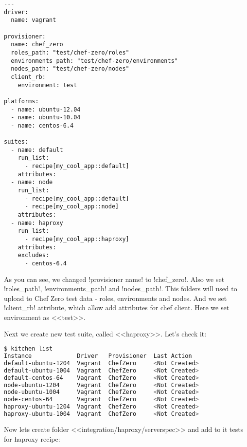 \begin{lstlisting}[label=lst:testing-chef-zero17]
---
driver:
  name: vagrant

provisioner:
  name: chef_zero
  roles_path: "test/chef-zero/roles"
  environments_path: "test/chef-zero/environments"
  nodes_path: "test/chef-zero/nodes"
  client_rb:
    environment: test

platforms:
  - name: ubuntu-12.04
  - name: ubuntu-10.04
  - name: centos-6.4

suites:
  - name: default
    run_list:
      - recipe[my_cool_app::default]
    attributes:
  - name: node
    run_list:
      - recipe[my_cool_app::default]
      - recipe[my_cool_app::node]
    attributes:
  - name: haproxy
    run_list:
      - recipe[my_cool_app::haproxy]
    attributes:
    excludes:
      - centos-6.4
\end{lstlisting}

As you can see, we changed \inline!provisioner name! to \inline!chef_zero!. Also we set \inline!roles_path!, \inline!environments_path! and \inline!nodes_path!. This folders will used to upload to Chef Zero test data - roles, environments and nodes. And we set \inline!client_rb! attribute, which allow add attributes for chef client. Here we set environment as <<test>>.

Next we create new test suite, called <<haproxy>>. Let's check it:

\begin{lstlisting}[language=Bash,label=lst:testing-chef-zero18]
$ kitchen list
Instance             Driver   Provisioner  Last Action
default-ubuntu-1204  Vagrant  ChefZero     <Not Created>
default-ubuntu-1004  Vagrant  ChefZero     <Not Created>
default-centos-64    Vagrant  ChefZero     <Not Created>
node-ubuntu-1204     Vagrant  ChefZero     <Not Created>
node-ubuntu-1004     Vagrant  ChefZero     <Not Created>
node-centos-64       Vagrant  ChefZero     <Not Created>
haproxy-ubuntu-1204  Vagrant  ChefZero     <Not Created>
haproxy-ubuntu-1004  Vagrant  ChefZero     <Not Created>
\end{lstlisting}

Now lets create folder <<integration/haproxy/serverspec>> and add to it tests for haproxy recipe:

